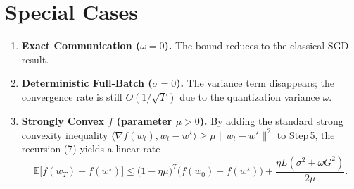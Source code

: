 \documentclass{article}
\begin{document}
\section*{Special Cases}
\begin{enumerate}[label=(\alph*)]
\item \textbf{Exact Communication ($\omega=0$).} The bound reduces to the classical SGD result.
\item \textbf{Deterministic Full‑Batch ($\sigma=0$).} The variance term disappears; the convergence rate is still $O(1/\sqrt{T})$ due to the quantization variance $\omega$.
\item \textbf{Strongly Convex $f$ (parameter $\mu>0$).} By adding the standard strong convexity inequality $\langle\nabla f(w_t),w_t-w^{\star}\rangle\ge\mu\|w_t-w^{\star}\|^{2}$ to Step 5, the recursion (7) yields a linear rate
\[
\mathbb{E}\!\big[f(w_T)-f(w^{\star})\big]\le
\Big(1-\eta\mu\Big)^{T}\big(f(w_0)-f(w^{\star})\big)
+\frac{\eta L(\sigma^{2}+\omega G^{2})}{2\mu}.
\]
\end{enumerate}
\end{document}
